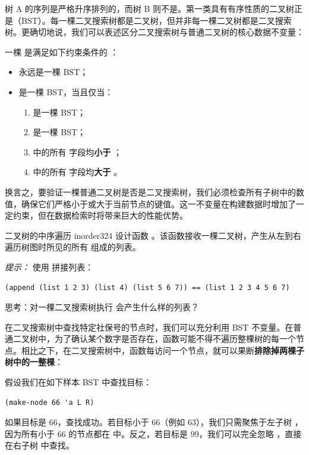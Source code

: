树 A 的序列是严格升序排列的，而树 B 则不是。第一类具有有序性质的二叉树正是（BST）。每一棵二叉搜索树都是二叉树，但并非每一棵二叉树都是二叉搜索树。更确切地说，我们可以表述区分二叉搜索树与普通二叉树的核心数据不变量：

\begin{notebox}
一棵  是满足如下约束条件的 ：
\begin{itemize}
  \item {} 永远是一棵 BST；
  \item {} 是一棵 BST，当且仅当：
  \begin{enumerate}
    \item {} 是一棵 BST；
    \item {} 是一棵 BST；
    \item {} 中的所有  字段均\textbf{小于} ；
    \item {} 中的所有  字段均\textbf{大于} 。
  \end{enumerate}
\end{itemize}
\end{notebox}

换言之，要验证一棵普通二叉树是否是二叉搜索树，我们必须检查所有子树中的数值，确保它们严格小于或大于当前节点的键值。这一不变量在构建数据时增加了一定约束，但在数据检索时将带来巨大的性能优势。

\begin{exercise}{二叉树的中序遍历 inorder}{324}
设计函数 。该函数接收一棵二叉树，产生从左到右遍历树图时所见的所有  组成的列表。

\emph{提示：} 使用  拼接列表：
\begin{lstlisting}[language=BSL]
(append (list 1 2 3) (list 4) (list 5 6 7)) == (list 1 2 3 4 5 6 7)
\end{lstlisting}
思考：对一棵二叉搜索树执行  会产生什么样的列表？
\end{exercise}

在二叉搜索树中查找特定社保号的节点时，我们可以充分利用 BST 不变量。在普通二叉树中，为了确认某个数字是否存在，函数可能不得不遍历整棵树的每一个节点。相比之下，在二叉搜索树中，函数每访问一个节点，就可以果断\textbf{排除掉两棵子树中的一整棵}：

假设我们在如下样本 BST 中查找目标：
\begin{lstlisting}[language=BSL]
(make-node 66 'a L R)
\end{lstlisting}
如果目标是 66，查找成功。若目标小于 66（例如 63），我们只需聚焦于左子树 ，因为所有小于 66 的节点都在  中。反之，若目标是 99，我们可以完全忽略 ，直接在右子树  中查找。

